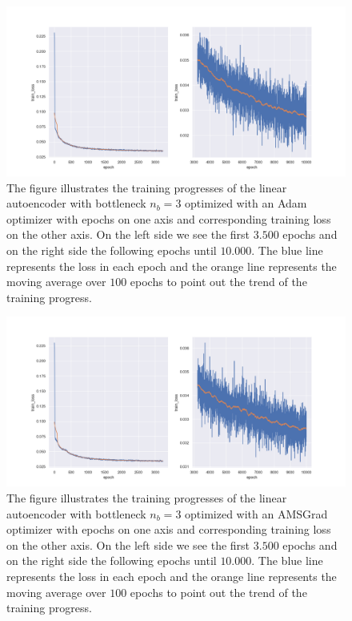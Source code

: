 \begin{figure}
\begin{center}
\includegraphics[width=\linewidth]{linear_AE_3d_adam_training_progress}
\end{center}
\caption{The figure illustrates the training progresses of the linear autoencoder with bottleneck $n_b=3$ optimized with an Adam optimizer with epochs on one axis and corresponding training loss on the other axis. On the left side we see the first $3.500$ epochs and on the right side the following epochs until $10.000$. The blue line represents the loss in each epoch and the orange line represents the moving average over $100$ epochs to point out the trend of the training progress.}\label{fig:linear_AE_3d_adam_training_progress}
\end{figure}


\begin{figure}
\begin{center}
\includegraphics[width=\linewidth]{linear_AE_3d_amsgrad_training_progress}
\end{center}
\caption{The figure illustrates the training progresses of the linear autoencoder with bottleneck $n_b=3$ optimized with an AMSGrad optimizer with epochs on one axis and corresponding training loss on the other axis. On the left side we see the first $3.500$ epochs and on the right side the following epochs until $10.000$. The blue line represents the loss in each epoch and the orange line represents the moving average over $100$ epochs to point out the trend of the training progress.}\label{fig:linear_AE_3d_amsgrad_training_progress}
\end{figure}


